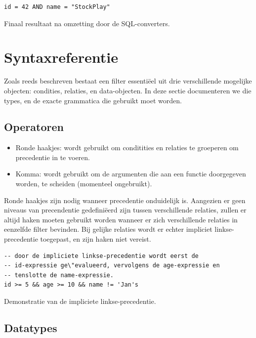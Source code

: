 \begin{code}
\begin{verbatim}
id = 42 AND name = "StockPlay"
\end{verbatim}
\caption{Finaal resultaat na omzetting door de SQL-converters.}
\end{code}


\section{Syntaxreferentie}

Zoals reeds beschreven bestaat een filter essenti\"eel uit drie verschillende mogelijke objecten: condities, relaties, en data-objecten. In deze sectie documenteren we die types, en de exacte grammatica die gebruikt moet worden.

\subsection{Operatoren}

\begin{itemize}
\item{Ronde haakjes: wordt gebruikt om conditities en relaties te groeperen om precedentie in te voeren.}
\item{Komma: wordt gebruikt om de argumenten die aan een functie doorgegeven worden, te scheiden (momenteel ongebruikt).}
\end{itemize}

Ronde haakjes zijn nodig wanneer precedentie onduidelijk is. Aangezien er geen niveaus van precendentie gedefini\"eerd zijn tussen verschillende relaties, zullen er altijd haken moeten gebruikt worden wanneer er zich verschillende relaties in eenzelfde filter bevinden. Bij gelijke relaties wordt er echter impliciet linkse-precedentie toegepast, en zijn haken niet vereist.

\begin{code}
\begin{verbatim}
-- door de impliciete linkse-precedentie wordt eerst de
-- id-expressie ge\"evalueerd, vervolgens de age-expressie en
-- tenslotte de name-expressie.
id >= 5 && age >= 10 && name != 'Jan's

\end{verbatim}
\caption{Demonstratie van de impliciete linkse-precedentie.}
\end{code}

\subsection{Datatypes}

